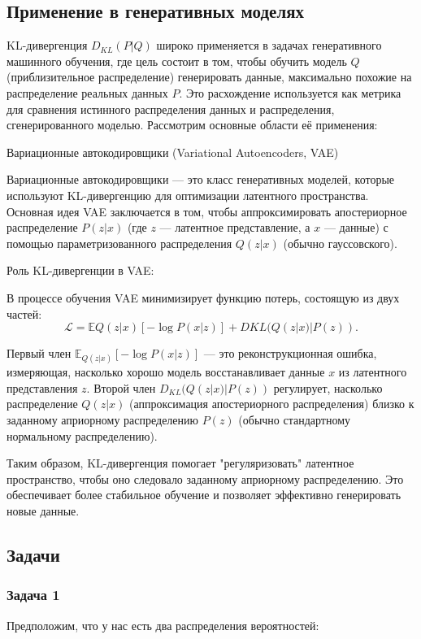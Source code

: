 \subsection*{Применение в генеративных моделях}
KL-дивергенция $D_{KL}(P | Q)$ широко применяется в задачах генеративного машинного обучения, где цель состоит в том, чтобы обучить модель $ Q $ (приблизительное распределение) генерировать данные, максимально похожие на распределение реальных данных $P$. Это расхождение используется как метрика для сравнения истинного распределения данных и распределения, сгенерированного моделью. Рассмотрим основные области её применения:

 Вариационные автокодировщики (Variational Autoencoders, VAE)

Вариационные автокодировщики — это класс генеративных моделей, которые используют KL-дивергенцию для оптимизации латентного пространства. Основная идея VAE заключается в том, чтобы аппроксимировать апостериорное распределение $ P(z|x) $ (где $ z $ — латентное представление, а $ x $ — данные) с помощью параметризованного распределения $Q(z|x)$ (обычно гауссовского).

Роль KL-дивергенции в VAE:

В процессе обучения VAE минимизирует функцию потерь, состоящую из двух частей:
\[
\mathcal{L} = \mathbb{E}{Q(z|x)}[-\log P(x|z)] + D{KL}(Q(z|x) | P(z)).
\]

    Первый член $\mathbb{E}_{Q(z|x)}[-\log P(x|z)]$ — это реконструкционная ошибка, измеряющая, насколько хорошо модель восстанавливает данные  $x$ из латентного представления $z$.
    Второй член $D_{KL}(Q(z|x) | P(z))$ регулирует, насколько распределение $Q(z|x)$ (аппроксимация апостериорного распределения) близко к заданному априорному распределению $ P(z) $ (обычно стандартному нормальному распределению).

Таким образом, KL-дивергенция помогает "регуляризовать" латентное пространство, чтобы оно следовало заданному априорному распределению. Это обеспечивает более стабильное обучение и позволяет эффективно генерировать новые данные.

\subsection*{Задачи}
\subsubsection* {Задача 1}
Предположим, что у нас есть два распределения вероятностей:


